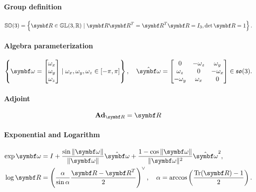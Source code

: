 \begin{properties}[breakable, title={$\SOthree$ formula sheet}]
  \paragraph{Group definition}
  \begin{equation}
    \SOthree = \left\{ \bR \in \GL(3, \mathbb{R}) \mid \bR \bR^{T} = \bR^{T} \bR = I_{3}, \det \bR = 1 \right\}.
  \end{equation}

  \paragraph{Algebra parameterization}
  \begin{equation}
    \left\{ \bomega = \begin{bmatrix} \omega_{x} \\ \omega_{y} \\ \omega_{z} \end{bmatrix}
    \mid \omega_{x}, \omega_{y}, \omega_{z} \in [-\pi, \pi] \right\}, \quad \hat \bomega = \begin{bmatrix} 0 & -\omega_{z} & \omega_{y} \\ \omega_{z} & 0 & -\omega_{x} \\ -\omega_{y} & \omega_{x} & 0 \end{bmatrix} \in \sothree.
  \end{equation}

  \paragraph{Adjoint}
  \begin{equation}
    \bAd_{\bR} = \bR
  \end{equation}

  \paragraph{Exponential and Logarithm}
  \begin{subequations}
    \begin{align}
      \label{eq:so3_exp}
      \exp \bomega & = I + \frac{\sin \| \bomega \|}{\|\bomega \|} \hat {\bomega} + \frac{1 - \cos \| \bomega \|}{\| \bomega \|^2} \hat {\bomega}^2,        \\
      \label{eq:so3_log}
      \log \bR     & = \left(\frac{\alpha}{\sin \alpha} \frac{\bR - \bR^T}{2} \right)^{\vee}, \quad \alpha = \arccos \left( \frac{\tr(\bR) - 1}{2} \right).
    \end{align}
  \end{subequations}


\end{properties}
